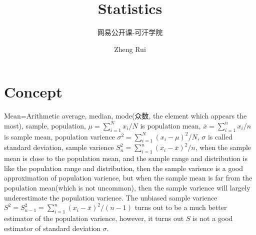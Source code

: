 \documentclass{llncs}
\begin{document}
\title{Statistics}


\subtitle{网易公开课-可汗学院}

\author{Zheng Rui}








\maketitle

\section{Concept}
Mean=Arithmetic average, median, mode(众数, the element which appears the most), sample, population, $\mu=\sum_{i=1}^{N}x_i/N$ is population mean, $\overline{x}=\sum_{i=1}^{n}x_i/n$ is sample mean, population varience $\sigma^2=\sum_{i=1}^{N}(x_i-\mu)^2/N$, $\sigma$ is called standard deviation, sample varience $S_n^2=\sum_{i=1}^{n}(x_i-\overline{x})^2/n$, when the sample mean is close to the population mean, and the sample range and distribution is like the population range and distribution, then the sample varience is a good approximation of population varience, but when the sample mean is far from the population mean(which is not uncommon), then the sample varience will largely underestimate the population varience. The unbiased sample varience $S^2=S_{n-1}^2=\sum_{i=1}^{n}(x_i-\overline{x})^2/(n-1)$ turns out to be a much better estimator of the population varience, however, it turns out $S$ is not a good estimator of standard deviation $\sigma$.
\end{document}
